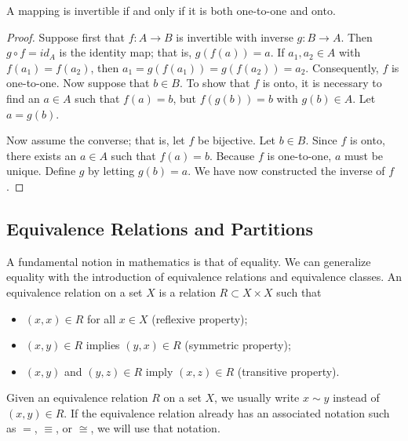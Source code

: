 \begin{theorem}\label{sets_theorem_4}
A mapping is invertible if and only if it is both one-to-one and onto. 
\end{theorem}

\begin{proof}
Suppose first that $f:A \rightarrow B$ is invertible with inverse $g: B \rightarrow A$. Then $g \circ f = id_A$ is the identity map; that is, $g(f(a)) = a$. If $a_1, a_2 \in A$ with $f(a_1) = f(a_2)$, then $a_1 = g(f(a_1)) = g(f(a_2)) = a_2$.  Consequently, $f$ is one-to-one.  Now suppose that $b \in B$. To show that $f$ is onto, it is necessary to find an $a \in A$ such that $f(a) = b$, but $f(g(b)) = b$ with $g(b) \in A$. Let $a = g(b)$. 

Now assume the converse; that is, let $f$ be bijective.  Let $b \in B$.  Since $f$ is onto, there exists an $a \in A$ such that $f(a) = b$.  Because $f$ is one-to-one, $a$ must be unique. Define $g$ by letting $g(b) = a$.  We have now constructed the inverse of $f$.
\end{proof}
 

\subsection*{Equivalence Relations and Partitions}

A fundamental notion in mathematics is that of equality.  We can generalize equality with the introduction of equivalence relations and equivalence classes.  An {\bfi equivalence relation\/} on a set $X$ is a relation $R \subset X \times X$ such that  
\begin{itemize}
 
\item
$(x, x) \in R$ for all $x \in X$ ({\bfi reflexive property});
  
\item
$(x, y) \in R$ implies $(y, x) \in R$ ({\bfi symmetric property});
 
\item
$(x, y)$ and $(y, z) \in R$ imply $(x, z) \in R$ ({\bfi transitive property}).
 
\end{itemize}
Given an equivalence relation $R$  on a set $X$, we usually write  $x \sim y$ instead of $(x, y) \in R$.  If the equivalence relation already has an associated notation such as $=$, $\equiv$, or $\cong$, we will
use that notation. 

\medskip

